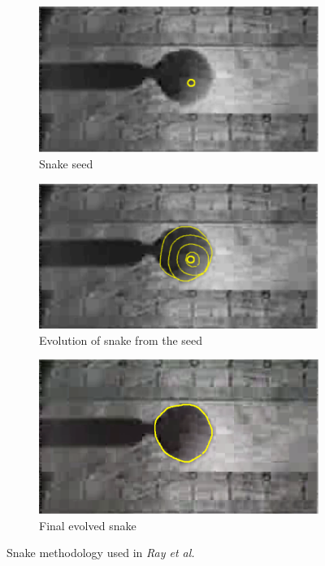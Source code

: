 \begin{figure}
\centering
  \begin{subfigure}[b]{0.45\textwidth}
    \includegraphics[width=\linewidth]{Images/Background/snake_a.png}
    \caption{Snake seed}
    \label{fig:snake_a}
  \end{subfigure}
\hfill
  \begin{subfigure}[b]{0.45\textwidth}
    \includegraphics[width=\linewidth]{Images/Background/snake_b.png}
    \caption{Evolution of snake from the seed}
    \label{fig:snake_b}
  \end{subfigure}
  \begin{subfigure}[b]{0.45\textwidth}
    \includegraphics[width=\linewidth]{Images/Background/snake_c.png}
    \caption{Final evolved snake}
    \label{fig:snake_c}
  \end{subfigure}
  \caption[Snake methodology application]{Snake methodology used in \textit{Ray et al.} \cite{Ray}}
  \label{fig:snakes}
\end{figure}

